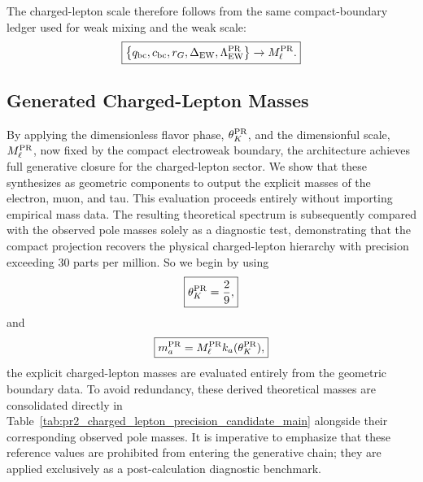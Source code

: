 \documentclass[11pt]{article}
\begin{document}
The charged-lepton scale therefore follows from the same compact-boundary ledger used for weak mixing and the weak scale:
\begin{equation}
\boxed{
\left\{
q_{\rm bc},
c_{\rm bc},
r_G,
\Delta_{\rm EW},
\Lambda_{\rm EW}^{\rm PR}
\right\}
\rightarrow
M_\ell^{\rm PR}.
}
\end{equation}

\subsection{Generated Charged-Lepton Masses}
\label{sec:pr2_generated_charged_lepton_masses}
By applying the dimensionless flavor phase, \(\theta_K^{\rm PR}\), and the dimensionful scale, \(M_\ell^{\rm PR}\), now fixed by the compact electroweak boundary, the architecture achieves full generative closure for the charged-lepton sector. We show that these synthesizes as geometric components to output the explicit masses of the electron, muon, and tau. This evaluation proceeds entirely without importing empirical mass data. The resulting theoretical spectrum is subsequently compared with the observed pole masses \cite{PDG2024} solely as a diagnostic test, demonstrating that the compact projection recovers the physical charged-lepton hierarchy with precision exceeding 30 parts per million. So we begin by using
\begin{equation}
\boxed{
\theta_K^{\rm PR}=\frac29,
}
\end{equation}
and
\begin{equation}
\boxed{
m_a^{\rm PR}
=
M_\ell^{\rm PR}k_a(\theta_K^{\rm PR}),
}
\end{equation}
the explicit charged-lepton masses are evaluated entirely from the geometric boundary data. To avoid redundancy, these derived theoretical masses are consolidated directly in Table~\ref{tab:pr2_charged_lepton_precision_candidate_main} alongside their corresponding observed pole masses. It is imperative to emphasize that these reference values are prohibited from entering the generative chain; they are applied exclusively as a post-calculation diagnostic benchmark.
\end{document}
